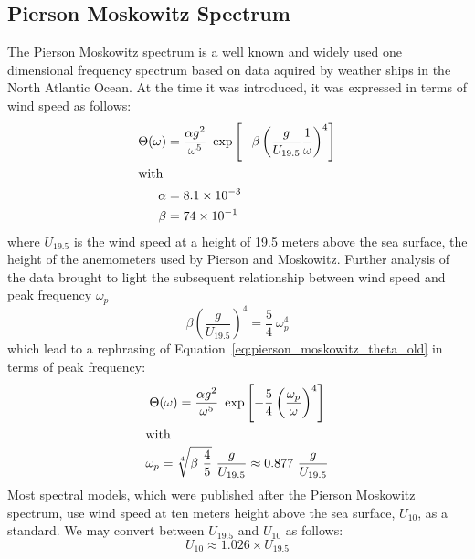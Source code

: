 \subsection{Pierson Moskowitz Spectrum}
\label{sec:pierson_moskowitz}
%
The Pierson Moskowitz spectrum \citep{article:PiersonMoskowitz1964} is a well 
known and widely used one dimensional frequency spectrum based on data aquired 
by weather ships in the North Atlantic Ocean. At the time it was introduced, 
it was expressed in terms of wind speed as follows:
\begin{subequations}
\label{eq:pierson_moskowitz_old}
\begin{align}
 \Theta(\omega) &= \frac{\alpha
g^2}{\omega^5}~\exp\left[-\beta\left(\frac{g}{U_{19.5}}\frac{1}{\omega}
\right)^4\right ] \label{eq:pierson_moskowitz_theta_old}\\
\intertext{with}
\alpha &= 8.1 \times 10^{-3} \label{eq:pierson_moskowitz_alpha} \\
\beta &= 74 \times 10^{-1} \label{eq:pierson_moskowitz_beta}
\end{align}
\end{subequations}
where $U_{19.5}$ is the wind speed at a height of 19.5 meters above the sea
surface, the height of the anemometers used by Pierson and Moskowitz. Further
analysis of the data brought to light the subsequent relationship between wind 
speed and peak frequency $\omega_p$
\begin{equation}
 \beta\left(\frac{g}{U_{19.5}}\right)^4 = \frac{5}{4}~\omega_p^4
\end{equation}
which lead to a rephrasing of Equation~\ref{eq:pierson_moskowitz_theta_old} in 
terms of peak frequency:
\begin{subequations}
\begin{gather}
 \Theta(\omega) = \frac{\alpha
g^2}{\omega^5}~\exp\left[-\frac{5}{4}\left(\frac{\omega_p}{\omega}
\right)^4\right ] \label{eq:pierson_moskowitz_theta}\\
\intertext{with}
\omega_p = \sqrt[4]{\beta~\frac{4}{5}}~\frac{g}{U_{19.5}} \approx
0.877~\frac{g}{U_{19.5}}
\end{gather}
\end{subequations}
Most spectral models, which were published after the Pierson Moskowitz spectrum,
use wind speed at ten meters height above the sea surface, $U_{10}$, as a 
standard. We may convert between $U_{19.5}$ and $U_{10}$ as follows:
\begin{equation}
 U_{10} \approx 1.026\times U_{19.5}
\end{equation}
